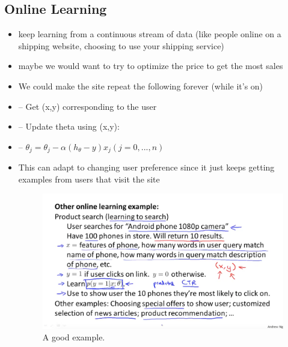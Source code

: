 \documentclass[]{article}
\begin{document}
	\subsection{Online Learning}
		\begin{itemize}
			\item keep learning from a continuous stream of data (like people online on a shipping website, choosing to use your shipping service)
			\item maybe we would want to try to optimize the price to get the most sales
			\item We could make the site repeat the following forever (while it's on)
			\item -- Get (x,y) corresponding to the user
			\item -- Update theta using (x,y):
			\item -- 	$\theta_j = \theta_j - \alpha(h_{\theta}-y)x_j (j=0,...,n)$
			\item This can adapt to changing user preference since it just keeps getting examples from users that visit the site
			\begin{figure}[ht!]
				\includegraphics[width= 1.5\textwidth,center]{Online_Learning_Example.png}
				\caption{A good example.}
			\end{figure}
		\end{itemize}
		
\end{document}
